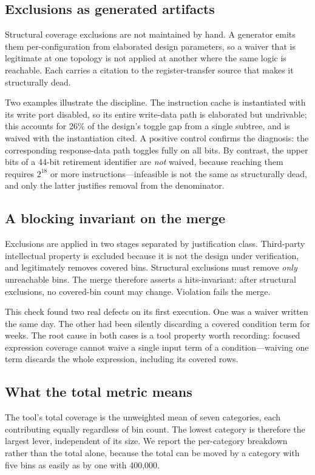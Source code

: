 \documentclass[conference]{IEEEtran}
\begin{document}
\subsection{Exclusions as generated artifacts}
Structural coverage exclusions are not maintained by hand. A generator
emits them per-configuration from elaborated design parameters, so a
waiver that is legitimate at one topology is not applied at another where
the same logic is reachable. Each carries a citation to the
register-transfer source that makes it structurally dead.

Two examples illustrate the discipline. The instruction cache is
instantiated with its write port disabled, so its entire write-data path
is elaborated but undrivable; this accounts for 26\% of the design's
toggle gap from a single subtree, and is waived with the instantiation
cited. A positive control confirms the diagnosis: the corresponding
response-data path toggles fully on all bits. By contrast, the upper bits
of a 44-bit retirement identifier are \emph{not} waived, because reaching
them requires $2^{18}$ or more instructions---infeasible is not the same
as structurally dead, and only the latter justifies removal from the
denominator.

\subsection{A blocking invariant on the merge}
Exclusions are applied in two stages separated by justification class.
Third-party intellectual property is excluded because it is not the design
under verification, and legitimately removes covered bins. Structural
exclusions must remove \emph{only} unreachable bins. The merge therefore
asserts a hits-invariant: after structural exclusions, no covered-bin count
may change. Violation fails the merge.

This check found two real defects on its first execution. One was a waiver
written the same day. The other had been silently discarding a covered
condition term for weeks. The root cause in both cases is a tool property
worth recording: focused expression coverage cannot waive a single input
term of a condition---waiving one term discards the whole expression,
including its covered rows.

\subsection{What the total metric means}
The tool's total coverage is the unweighted mean of seven categories,
each contributing equally regardless of bin count. The lowest category is
therefore the largest lever, independent of its size. We report the
per-category breakdown rather than the total alone, because the total can
be moved by a category with five bins as easily as by one with 400,000.
\end{document}
